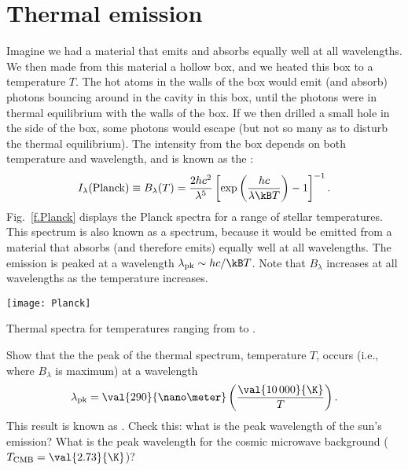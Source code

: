 \section{Thermal emission}
\label{s.thermal-emission}

Imagine we had a material that emits and absorbs equally well at all wavelengths. We then made from this material a hollow box, and we heated this box to a temperature $T$. The hot atoms in the walls of the box would emit (and absorb) photons bouncing around in the cavity in this box, until the photons were in thermal equilibrium with the walls of the box. If we then drilled a small hole in the side of the box, some photons would escape (but not so many as to disturb the thermal equilibrium). The intensity from the box depends on both temperature and wavelength, and is known as the :
\begin{equation}\label{e.planck-spectrum-wavelength}
I_{\lambda}(\mathrm{Planck}) \equiv B_{\lambda}(T) = \frac{2hc^{2}}{\lambda^{5}} \left[\exp\left(\frac{hc}{\lambda\kB T}\right)-1\right]^{-1}.
\end{equation}
Fig.~\ref{f.Planck} displays the Planck spectra for a range of stellar temperatures. This spectrum is also known as a  spectrum, because it would be emitted from a material that absorbs (and therefore emits) equally well at all wavelengths. The emission is peaked at a wavelength $\lambda_{\mathrm{pk}} \sim hc/\kB T$. Note that $B_{\lambda}$ increases at all wavelengths as the temperature increases.
\begin{marginfigure}[-12\baselineskip]
\texttt{[image: Planck]}
\caption[Thermal spectra]{\label{f.Planck}Thermal spectra for temperatures ranging from  to .}
\end{marginfigure}

\begin{exercisebox}\label{ex.Wien-wavelength}
Show that the the peak of the thermal spectrum, temperature $T$, occurs (i.e., where $B_{\lambda}$ is maximum) at a wavelength
\[ \lambda_{\mathrm{pk}} = \val{290}{\nano\meter}\left(\frac{\val{10\,000}{\K}}{T}\right). \]
This result is known as . Check this: what is the peak wavelength of the sun's emission? What is the peak wavelength for the cosmic microwave background ($T_{\mathrm{CMB}} = \val{2.73}{\K}$)?
\end{exercisebox}

